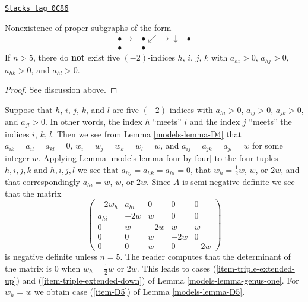 \begin{lemma}[Fourfold]
\label{models-lemma-fourfold}
\href{https://stacks.math.columbia.edu/tag/0C86}{\texttt{Stacks tag 0C86}}

Nonexistence of proper subgraphs of the form
$$
\begin{array}{ccc}\bullet \longrightarrow & \bullet \swarrow\longrightarrow\downarrow & \bullet \\ \bullet & \bullet & \end{array}
$$
If $n > 5$, there do {\bf not} exist five $(-2)$-indices
$h$, $i$, $j$, $k$ with $a_{hi} > 0$, $a_{hj} > 0$, $a_{hk} > 0$, and
$a_{hl} > 0$.
\end{lemma}

\begin{proof}
See discussion above.
\end{proof}

Suppose that $h$, $i$, $j$, $k$, and $l$ are five $(-2)$-indices
with $a_{hi} > 0$, $a_{ij} > 0$, $a_{jk} > 0$, and $a_{jl} > 0$.
In other words, the index $h$ ``meets'' $i$ and the index $j$ ``meets''
the indices $i$, $k$, $l$. Then we see from
Lemma \ref{models-lemma-D4} that $a_{ik} = a_{il} = a_{kl} = 0$,
$w_i = w_j = w_k = w_l = w$, and $a_{ij} = a_{jk} = a_{jl} = w$
for some integer $w$. Applying Lemma \ref{models-lemma-four-by-four} to
the four tuples
$h, i, j, k$ and $h, i, j, l$ we see that $a_{hj} = a_{hk} = a_{hl} = 0$,
that $w_h = \frac{1}{2}w$, $w$, or $2w$, and that
correspondingly $a_{hi} = w$, $w$, or $2w$.
Since $A$ is semi-negative definite we see that the matrix
$$
\left(
\begin{matrix}
-2w_h & a_{hi} & 0 & 0 & 0 \\
a_{hi} & -2w & w & 0 & 0 \\
0 & w & -2w & w & w \\
0 & 0 & w & -2w & 0 \\
0 & 0 & w & 0 & -2w
\end{matrix}
\right)
$$
is negative definite unless $n = 5$. The reader computes that the
determinant of the matrix is $0$ when $w_h = \frac{1}{2}w$ or $2w$.
This leads to cases (\ref{item-triple-extended-up}) and
(\ref{item-triple-extended-down}) of Lemma \ref{models-lemma-genus-one}.
For $w_h = w$ we obtain case (\ref{item-D5}) of
Lemma \ref{models-lemma-D5}.

